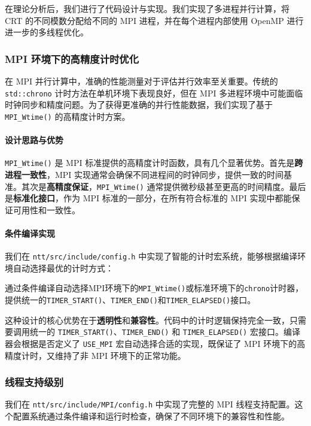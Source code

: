 \documentclass[a4paper]{article}
\begin{document}
在理论分析后，我们进行了代码设计与实现。我们实现了多进程并行计算，将 CRT 的不同模数分配给不同的 MPI 进程，并在每个进程内部使用 OpenMP 进行进一步的多线程优化。

\subsubsection{MPI 环境下的高精度计时优化}

在 MPI 并行计算中，准确的性能测量对于评估并行效率至关重要。传统的 \texttt{std::chrono} 计时方法在单机环境下表现良好，但在 MPI 多进程环境中可能面临时钟同步和精度问题。为了获得更准确的并行性能数据，我们实现了基于 \texttt{MPI\_Wtime()} 的高精度计时方案。

\paragraph{设计思路与优势}

\texttt{MPI\_Wtime()} 是 MPI 标准提供的高精度计时函数，具有几个显著优势。首先是\textbf{跨进程一致性}，MPI 实现通常会确保不同进程间的时钟同步，提供一致的时间基准。其次是\textbf{高精度保证}，\texttt{MPI\_Wtime()} 通常提供微秒级甚至更高的时间精度。最后是\textbf{标准化接口}，作为 MPI 标准的一部分，在所有符合标准的 MPI 实现中都能保证可用性和一致性。

\paragraph{条件编译实现}

我们在 \texttt{ntt/src/include/config.h} 中实现了智能的计时宏系统，能够根据编译环境自动选择最优的计时方式：

通过条件编译自动选择MPI环境下的\texttt{MPI\_Wtime()}或标准环境下的\texttt{chrono}计时器，提供统一的\texttt{TIMER\_START()}、\texttt{TIMER\_END()}和\texttt{TIMER\_ELAPSED()}接口。

这种设计的核心优势在于\textbf{透明性}和\textbf{兼容性}。代码中的计时逻辑保持完全一致，只需要调用统一的 \texttt{TIMER\_START()}、\texttt{TIMER\_END()} 和 \texttt{TIMER\_ELAPSED()} 宏接口。编译器会根据是否定义了 \texttt{USE\_MPI} 宏自动选择合适的实现，既保证了 MPI 环境下的高精度计时，又维持了非 MPI 环境下的正常功能。

\subsubsection{线程支持级别}

我们在 \texttt{ntt/src/include/MPI/config.h} 中实现了完整的 MPI 线程支持配置。这个配置系统通过条件编译和运行时检查，确保了不同环境下的兼容性和性能。
\end{document}

